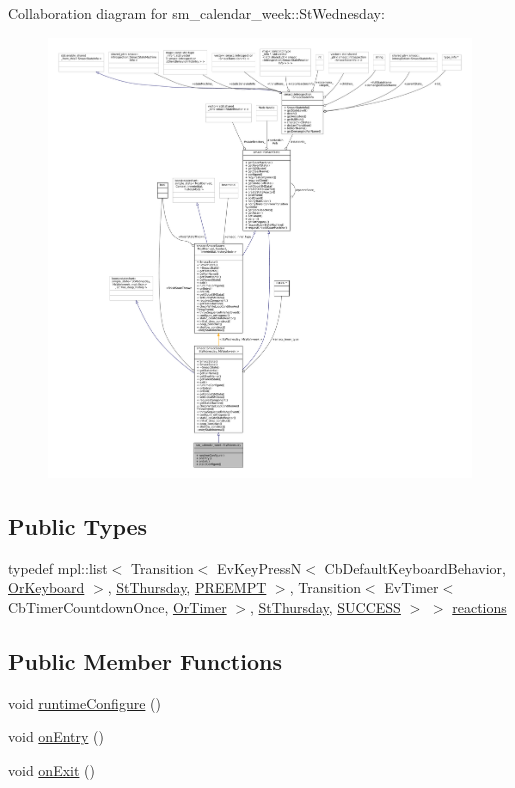 Collaboration diagram for sm\+\_\+calendar\+\_\+week\+:\+:St\+Wednesday\+:
\nopagebreak
\begin{figure}[H]
\begin{center}
\leavevmode
\includegraphics[width=350pt]{structsm__calendar__week_1_1StWednesday__coll__graph}
\end{center}
\end{figure}
\subsection*{Public Types}
\begin{DoxyCompactItemize}
\item 
typedef mpl\+::list$<$ Transition$<$ Ev\+Key\+PressN$<$ Cb\+Default\+Keyboard\+Behavior, \hyperlink{classsm__calendar__week_1_1OrKeyboard}{Or\+Keyboard} $>$, \hyperlink{structsm__calendar__week_1_1StThursday}{St\+Thursday}, \hyperlink{classPREEMPT}{P\+R\+E\+E\+M\+PT} $>$, Transition$<$ Ev\+Timer$<$ Cb\+Timer\+Countdown\+Once, \hyperlink{classsm__calendar__week_1_1OrTimer}{Or\+Timer} $>$, \hyperlink{structsm__calendar__week_1_1StThursday}{St\+Thursday}, \hyperlink{classSUCCESS}{S\+U\+C\+C\+E\+SS} $>$ $>$ \hyperlink{structsm__calendar__week_1_1StWednesday_aa21e502e00fa09b841f8693bdb05e86d}{reactions}
\end{DoxyCompactItemize}
\subsection*{Public Member Functions}
\begin{DoxyCompactItemize}
\item 
void \hyperlink{structsm__calendar__week_1_1StWednesday_a5f47539c7bdbfaa8c808b5045e95444c}{runtime\+Configure} ()
\item 
void \hyperlink{structsm__calendar__week_1_1StWednesday_ae2e702b07c1fcbd843c5845173ec3c93}{on\+Entry} ()
\item 
void \hyperlink{structsm__calendar__week_1_1StWednesday_ad8f33f74cc9c8e40b9b84813d052d9c2}{on\+Exit} ()
\end{DoxyCompactItemize}
